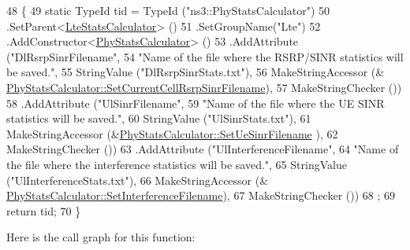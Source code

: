 \begin{DoxyCode}
48 \{
49   \textcolor{keyword}{static} TypeId tid = TypeId (\textcolor{stringliteral}{"ns3::PhyStatsCalculator"})
50     .SetParent<\hyperlink{classns3_1_1LteStatsCalculator_a4d74204c35bb226063fb38662072b272}{LteStatsCalculator}> ()
51     .SetGroupName(\textcolor{stringliteral}{"Lte"})
52     .AddConstructor<\hyperlink{classns3_1_1PhyStatsCalculator_a6dde48a5df609ffc909e3825e53b0e30}{PhyStatsCalculator}> ()
53     .AddAttribute (\textcolor{stringliteral}{"DlRsrpSinrFilename"},
54                    \textcolor{stringliteral}{"Name of the file where the RSRP/SINR statistics will be saved."},
55                    StringValue (\textcolor{stringliteral}{"DlRsrpSinrStats.txt"}),
56                    MakeStringAccessor (&
      \hyperlink{classns3_1_1PhyStatsCalculator_a554e051adef52b9c52fe3832166dbb71}{PhyStatsCalculator::SetCurrentCellRsrpSinrFilename}),
57                    MakeStringChecker ())
58     .AddAttribute (\textcolor{stringliteral}{"UlSinrFilename"},
59                    \textcolor{stringliteral}{"Name of the file where the UE SINR statistics will be saved."},
60                    StringValue (\textcolor{stringliteral}{"UlSinrStats.txt"}),
61                    MakeStringAccessor (&\hyperlink{classns3_1_1PhyStatsCalculator_a7af5e5c196db507c1aa80c807146072c}{PhyStatsCalculator::SetUeSinrFilename}
      ),
62                    MakeStringChecker ())
63     .AddAttribute (\textcolor{stringliteral}{"UlInterferenceFilename"},
64                    \textcolor{stringliteral}{"Name of the file where the interference statistics will be saved."},
65                    StringValue (\textcolor{stringliteral}{"UlInterferenceStats.txt"}),
66                    MakeStringAccessor (&
      \hyperlink{classns3_1_1PhyStatsCalculator_a2b07294a3e5f7c8a239b06ccb1bf2529}{PhyStatsCalculator::SetInterferenceFilename}),
67                    MakeStringChecker ())
68   ;
69   \textcolor{keywordflow}{return} tid;
70 \}
\end{DoxyCode}


Here is the call graph for this function\+:


